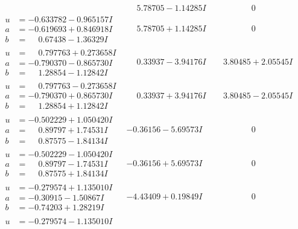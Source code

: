 \documentclass[1p]{elsarticle_modified}
\theoremstyle{definition}
\begin{document}
$$\begin{array}{c|c|c}
 & \phantom{-}5.78705 - 1.14285 I & \phantom{-0.000000 } 0 \\ \hline\begin{aligned}
u &= -0.633782 - 0.965157 I \\
a &= -0.619693 + 0.846918 I \\
b &= \phantom{-}0.67438 - 1.36329 I\end{aligned}
 & \phantom{-}5.78705 + 1.14285 I & \phantom{-0.000000 } 0 \\ \hline\begin{aligned}
u &= \phantom{-}0.797763 + 0.273658 I \\
a &= -0.790370 - 0.865730 I \\
b &= \phantom{-}1.28854 - 1.12842 I\end{aligned}
 & \phantom{-}0.33937 - 3.94176 I & \phantom{-}3.80485 + 2.05545 I \\ \hline\begin{aligned}
u &= \phantom{-}0.797763 - 0.273658 I \\
a &= -0.790370 + 0.865730 I \\
b &= \phantom{-}1.28854 + 1.12842 I\end{aligned}
 & \phantom{-}0.33937 + 3.94176 I & \phantom{-}3.80485 - 2.05545 I \\ \hline\begin{aligned}
u &= -0.502229 + 1.050420 I \\
a &= \phantom{-}0.89797 + 1.74531 I \\
b &= \phantom{-}0.87575 - 1.84134 I\end{aligned}
 & -0.36156 - 5.69573 I & \phantom{-0.000000 } 0 \\ \hline\begin{aligned}
u &= -0.502229 - 1.050420 I \\
a &= \phantom{-}0.89797 - 1.74531 I \\
b &= \phantom{-}0.87575 + 1.84134 I\end{aligned}
 & -0.36156 + 5.69573 I & \phantom{-0.000000 } 0 \\ \hline\begin{aligned}
u &= -0.279574 + 1.135010 I \\
a &= -0.30915 - 1.50867 I \\
b &= -0.74203 + 1.28219 I\end{aligned}
 & -4.43409 + 0.19849 I & \phantom{-0.000000 } 0 \\ \hline\begin{aligned}
u &= -0.279574 - 1.135010 I \\

\end{aligned}
\end{array}$$
\end{document}
